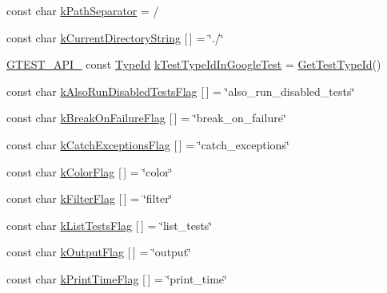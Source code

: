 \begin{DoxyCompactItemize}
\item 
const char \hyperlink{namespacetesting_1_1internal_afcd71adaa9d1e6df7b282a17fc48125c}{k\+Path\+Separator} = \textquotesingle{}/\textquotesingle{}
\item 
const char \hyperlink{namespacetesting_1_1internal_a23a8e9527d0e544e7df2d64ad549ce3e}{k\+Current\+Directory\+String} \mbox{[}$\,$\mbox{]} = \char`\"{}./\char`\"{}
\item 
\hyperlink{gtest-port_8h_aa73be6f0ba4a7456180a94904ce17790}{G\+T\+E\+S\+T\+\_\+\+A\+P\+I\+\_\+} const \hyperlink{namespacetesting_1_1internal_ab1114197d3c657d8b7f8e0c5caa12d00}{Type\+Id} \hyperlink{namespacetesting_1_1internal_acac7993efabbd9dd62c1e9c7d143a72f}{k\+Test\+Type\+Id\+In\+Google\+Test} = \hyperlink{namespacetesting_1_1internal_ad0d66d56ead224263cd100c1d6bfc562}{Get\+Test\+Type\+Id}()
\item 
const char \hyperlink{namespacetesting_1_1internal_ad5882ed0ceadc0f23090f0f08b5d495b}{k\+Also\+Run\+Disabled\+Tests\+Flag} \mbox{[}$\,$\mbox{]} = \char`\"{}also\+\_\+run\+\_\+disabled\+\_\+tests\char`\"{}
\item 
const char \hyperlink{namespacetesting_1_1internal_a804c907155bfee3a6616ae3ca04048d0}{k\+Break\+On\+Failure\+Flag} \mbox{[}$\,$\mbox{]} = \char`\"{}break\+\_\+on\+\_\+failure\char`\"{}
\item 
const char \hyperlink{namespacetesting_1_1internal_af4bb309802e83df0927097e6e4201a38}{k\+Catch\+Exceptions\+Flag} \mbox{[}$\,$\mbox{]} = \char`\"{}catch\+\_\+exceptions\char`\"{}
\item 
const char \hyperlink{namespacetesting_1_1internal_a884ff13b75232fbe7daa0caf46f1de66}{k\+Color\+Flag} \mbox{[}$\,$\mbox{]} = \char`\"{}color\char`\"{}
\item 
const char \hyperlink{namespacetesting_1_1internal_a8cb8ee7fe7659e6916a0108dffa2f7dc}{k\+Filter\+Flag} \mbox{[}$\,$\mbox{]} = \char`\"{}filter\char`\"{}
\item 
const char \hyperlink{namespacetesting_1_1internal_a1d3cfebffefbf35f7033d4941493a8ff}{k\+List\+Tests\+Flag} \mbox{[}$\,$\mbox{]} = \char`\"{}list\+\_\+tests\char`\"{}
\item 
const char \hyperlink{namespacetesting_1_1internal_abd5368e00a31d175c6696cf76cbbde10}{k\+Output\+Flag} \mbox{[}$\,$\mbox{]} = \char`\"{}output\char`\"{}
\item 
const char \hyperlink{namespacetesting_1_1internal_aa6c13109bb4c78740ddb082b1ec0de56}{k\+Print\+Time\+Flag} \mbox{[}$\,$\mbox{]} = \char`\"{}print\+\_\+time\char`\"{}
\item 

\end{DoxyCompactItemize}
